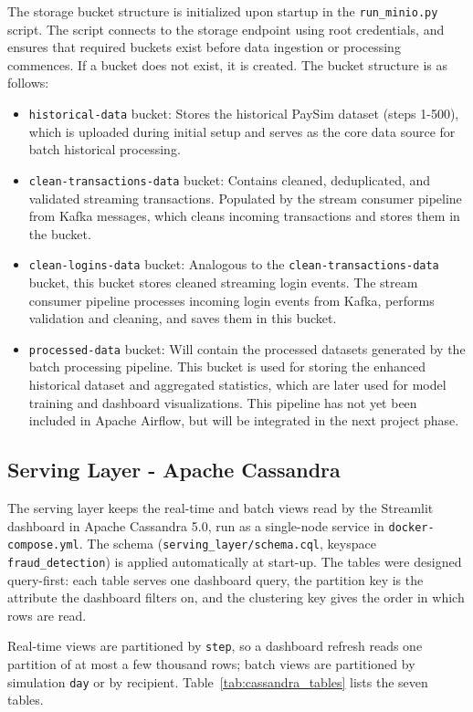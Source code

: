 \documentclass[titlepage]{article}
\begin{document}
The storage bucket structure is initialized upon startup in the \texttt{run\_minio.py} script. The script connects to the storage endpoint using root credentials, and ensures that required buckets exist before data ingestion or processing commences. If a bucket does not exist, it is created. The bucket structure is as follows:
\begin{itemize}
    \item \texttt{historical-data} bucket: Stores the historical PaySim dataset (steps 1-500), which is uploaded during initial setup and serves as the core data source for batch historical processing.
    \item \texttt{clean-transactions-data} bucket: Contains cleaned, deduplicated, and validated streaming transactions. Populated by the stream consumer pipeline from Kafka messages, which cleans incoming transactions and stores them in the bucket.
    \item \texttt{clean-logins-data} bucket: Analogous to the \texttt{clean-transactions-data} bucket, this bucket stores cleaned streaming login events. The stream consumer pipeline processes incoming login events from Kafka, performs validation and cleaning, and saves them in this bucket.
    \item \texttt{processed-data} bucket: Will contain the processed datasets generated by the batch processing pipeline. This bucket is used for storing the enhanced historical dataset and aggregated statistics, which are later used for model training and dashboard visualizations. This pipeline has not yet been included in Apache Airflow, but will be integrated in the next project phase.
\end{itemize}

\subsection{Serving Layer - Apache Cassandra}
\label{sec:cassandra}

The serving layer keeps the real-time and batch views read by the Streamlit dashboard in Apache Cassandra 5.0, run as a single-node service in \texttt{docker-compose.yml}. 
The schema (\texttt{serving\_layer/schema.cql}, keyspace \texttt{fraud\_detection}) is applied automatically at start-up.
The tables were designed query-first: each table serves one dashboard query, the partition key is the attribute the dashboard filters on, and the clustering key gives the order in which rows are read.

Real-time views are partitioned by \texttt{step}, so a dashboard refresh reads one partition of at most a few thousand rows; batch views are partitioned by simulation \texttt{day} or by recipient. 
Table~\ref{tab:cassandra_tables} lists the seven tables.
\end{document}
